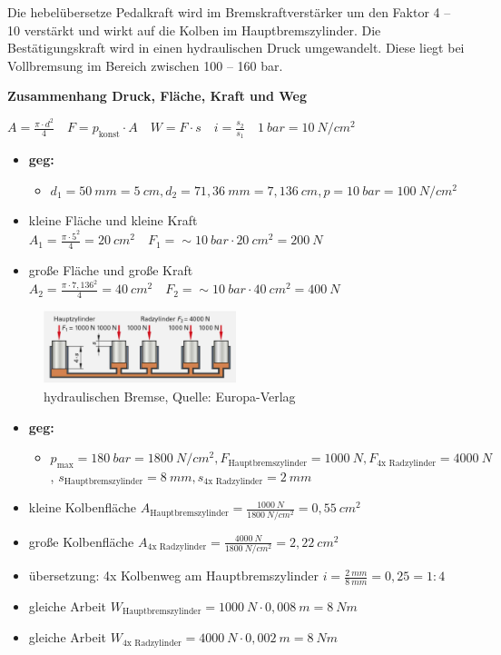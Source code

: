 Die hebelübersetze Pedalkraft wird im Bremskraftverstärker um den Faktor
4 -- 10 verstärkt und wirkt auf die Kolben im Hauptbremszylinder. Die
Bestätigungskraft wird in einen hydraulischen Druck umgewandelt. Diese
liegt bei Vollbremsung im Bereich zwischen 100 -- 160 bar.

\textbf{Zusammenhang Druck, Fläche, Kraft und Weg}

$\boxed{A = \frac{\pi \cdot d^2}{4}} \quad \boxed{F = p_\text{konst} \cdot A} \quad \boxed{W = F \cdot s} \quad \boxed{i = \frac{s_2}{s_1}} \quad \boxed{1~bar = 10~N/cm^2}$

\begin{itemize}
\item
  \textbf{geg:}

  \begin{itemize}
  \item
    $d_1 = 50~mm = 5~cm, d_2 = 71,36~mm = 7,136~cm, p = 10~bar = 100~N/cm^2$
  \end{itemize}
\item
  kleine Fläche und kleine Kraft
  $A_1 = \frac{\pi \cdot 5^2}{4} = 20~cm^2 \quad F_1 = \sim 10~bar \cdot 20~cm^2 = 200~N$
\item
  große Fläche und große Kraft
  $A_2 = \frac{\pi \cdot 7,136^2}{4} = 40~cm^2 \quad F_2 = \sim 10~bar \cdot 40~cm^2 = 400~N$
\end{itemize}

\begin{figure}[!ht]%
\centering
\includegraphics[width=0.5\textwidth]{images/Bremsen/Bremsen-1.pdf}
\caption{hydraulischen Bremse, Quelle: Europa-Verlag}
\end{figure}

\begin{itemize}
\item
  \textbf{geg:}

  \begin{itemize}
  \item
    $p_\text{max} = 180~bar = 1800~N/cm^2, F_\text{Hauptbremszylinder} = 1000~N, F_\text{4x Radzylinder} = 4000~N$,
    $s_\text{Hauptbremszylinder} = 8~mm, s_\text{4x Radzylinder} = 2~mm$
  \end{itemize}
\item
  kleine Kolbenfläche
  $A_\text{Hauptbremszylinder} = \frac{1000~N}{1800~N/cm^2} = 0,55~cm^2$
\item
  große Kolbenfläche
  $A_\text{4x Radzylinder} = \frac{4000~N}{1800~N/cm^2} = 2,22~cm^2$
\item
  übersetzung: 4x Kolbenweg am Hauptbremszylinder
  $i = \frac{2~mm}{8~mm} = 0,25 = 1:4$
\item
  gleiche Arbeit
  $W_\text{Hauptbremszylinder} = 1000~N \cdot 0,008~m = 8~Nm$
\item
  gleiche Arbeit
  $W_\text{4x Radzylinder} = 4000~N \cdot 0,002~m = 8~Nm$
\end{itemize}

